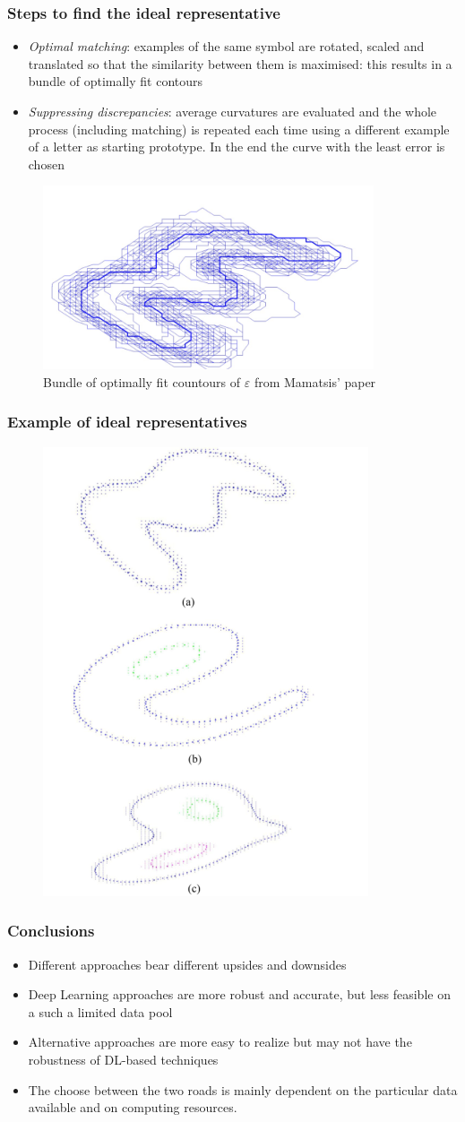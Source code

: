 \documentclass{beamer}
\begin{document}
\begin{frame}
	\frametitle{Steps to find the ideal representative}
	\begin{itemize}
		\item \emph{Optimal matching}: examples of the same symbol are rotated, scaled and translated so that the similarity between them is maximised: this results in a bundle of optimally fit contours
		\item \emph{Suppressing discrepancies}: average curvatures are evaluated and the whole process (including matching) is repeated each time using a different example of a letter as starting prototype. In the end the curve with the least error is chosen
	\end{itemize}
	\begin{figure}[h]
		\centering
		\includegraphics[width=0.4\linewidth]{img/screenshot002}
		\caption{Bundle of optimally fit countours of $\varepsilon$ from Mamatsis' paper}
		\label{fig:screenshot002}
	\end{figure}
\end{frame}
\begin{frame}
	\frametitle{Example of ideal representatives}
	\begin{figure}
		\centering
		\includegraphics[width=0.4\linewidth]{img/mamatsis1}
		\label{fig:mamatsis1}
	\end{figure}
\end{frame}
\begin{frame}
	\frametitle{Conclusions}
	\begin{itemize}
		\item Different approaches bear different upsides and downsides
		\item Deep Learning approaches are more robust and accurate, but less feasible on a such a limited data pool
		\item Alternative approaches are more easy to realize but may not have the robustness of DL-based techniques
		\item The choose between the two roads is mainly dependent on the particular data available and on computing resources.
	\end{itemize}
\end{frame}
\end{document}
